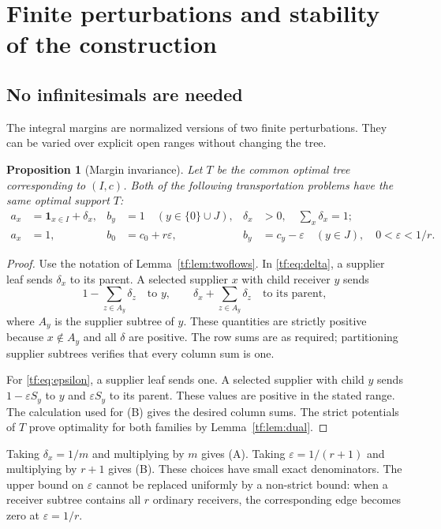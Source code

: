 \documentclass[11pt]{article}
\numberwithin{equation}{section}
\newtheorem{proposition}[theorem]{Proposition}
\theoremstyle{definition}
\newcommand{\one}{\mathbf 1}
\begin{document}
\section{Finite perturbations and stability of the construction}
\label{tf:sec:perturbations}

\subsection{No infinitesimals are needed}
The integral margins are normalized versions of two finite perturbations.
They can be varied over explicit open ranges without changing the tree.

\begin{proposition}[Margin invariance]
\label{tf:prop:margins}
Let $T$ be the common optimal tree corresponding to $(I,c)$. Both of the
following transportation problems have the same optimal support $T$:
\begin{align}
 a_x&=\one_{x\in I}+\delta_x,& b_y&=1\quad(y\in\{0\}\cup J),
 &\delta_x&>0,\quad\sum_x\delta_x=1; \label{tf:eq:delta}\\
 a_x&=1,& b_0&=c_0+r\varepsilon,
 & b_y&=c_y-\varepsilon\quad(y\in J),\quad 0<\varepsilon<1/r.
 \label{tf:eq:epsilon}
\end{align}
\end{proposition}
\begin{proof}
Use the notation of Lemma~\ref{tf:lem:twoflows}. In \eqref{tf:eq:delta}, a
supplier leaf sends $\delta_x$ to its parent. A selected supplier $x$
with child receiver $y$ sends
\[
 1-\sum_{z\in A_y}\delta_z\quad\text{to }y,
 \qquad \delta_x+\sum_{z\in A_y}\delta_z\quad\text{to its parent},
\]
where $A_y$ is the supplier subtree of $y$. These quantities are strictly
positive because $x\notin A_y$ and all $\delta$ are positive. The row
sums are as required; partitioning supplier subtrees verifies that every
column sum is one.

For \eqref{tf:eq:epsilon}, a supplier leaf sends one. A selected supplier
with child $y$ sends $1-\varepsilon S_y$ to $y$ and
$\varepsilon S_y$ to its parent. These values are positive in the stated
range. The calculation used for (B) gives the desired column sums.
The strict potentials of $T$ prove optimality for both families by
Lemma~\ref{tf:lem:dual}.
\end{proof}

Taking $\delta_x=1/m$ and multiplying by $m$ gives (A). Taking
$\varepsilon=1/(r+1)$ and multiplying by $r+1$ gives (B). These choices
have small exact denominators. The upper bound on $\varepsilon$ cannot be
replaced uniformly by a non-strict bound: when a receiver subtree contains
all $r$ ordinary receivers, the corresponding edge becomes zero at
$\varepsilon=1/r$.
\end{document}
